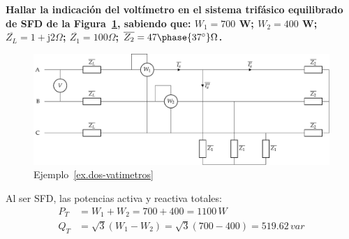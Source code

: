 \begin{example}\label{ex.dos-vatimetros}
\textbf{Hallar la indicación del voltímetro en el sistema trifásico equilibrado de SFD de la Figura~\ref{fig:ej_dosvat}, sabiendo que: $W_1=700$ W; $W_2=400$ W; $\overline{Z_L}=1+\mathrm{j}2\Omega$; $\overline{Z_1}=100\Omega$; $\overline{Z_2}=47\phase{37^\circ}\Omega$.}
\begin{figure}[H]
    \centering
    \includegraphics[width=.9\linewidth]{../figs/ej_dosvat.pdf}
    \caption{Ejemplo~\ref{ex.dos-vatimetros}}
    \label{fig:ej_dosvat}
\end{figure}

Al ser SFD, las potencias activa y reactiva totales:
\begin{align*}
    P_T&=W_1+W_2=700+400=1100\,W\\
    Q_T&=\sqrt{3}(W_1-W_2)=\sqrt{3}(700-400)=519.62\,var
\end{align*}


\end{example}
